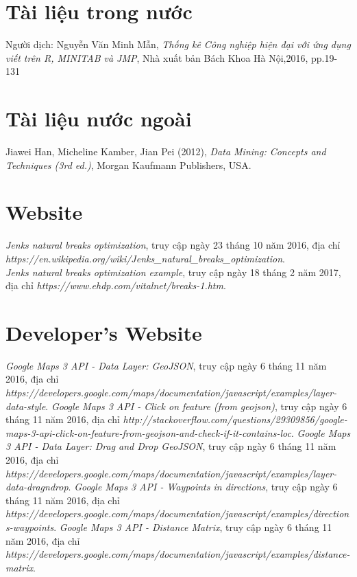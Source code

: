 \documentclass[a4paper, 13pt]{report}
\begin{document}
\cleardoublepage
{}
\begin{thebibliography}{9}
\section*{Tài liệu trong nước}
	Người dịch: Nguyễn Văn Minh Mẫn, 
	\emph{Thống kê Công nghiệp hiện đại với ứng dụng viết trên R, MINITAB và JMP},
	Nhà xuất bản Bách Khoa Hà Nội,2016, pp.19-131
\section*{Tài liệu nước ngoài}
	Jiawei Han, Micheline Kamber, Jian Pei (2012),
	\emph{Data Mining: Concepts and Techniques (3rd ed.)},
	Morgan Kaufmann Publishers, USA.
\section*{Website}
	\emph{Jenks natural breaks optimization}, truy cập ngày 23 tháng 10 năm 2016,
	địa chỉ \emph{https://en.wikipedia.org/wiki/Jenks\_natural\_breaks\_optimization}.\\
	\emph{Jenks natural breaks optimization example}, truy cập ngày 18 tháng 2 năm 2017,
	địa chỉ \emph{https://www.ehdp.com/vitalnet/breaks-1.htm}.
\section*{Developer's Website}
	\emph{Google Maps 3 API - Data Layer: GeoJSON}, truy cập ngày 6 tháng 11 năm 2016,
	địa chỉ \emph{https://developers.google.com/maps/documentation/javascript/examples/layer-data-style}.	
	\emph{Google Maps 3 API - Click on feature (from geojson)}, truy cập ngày 6 tháng 11 năm 2016,
	địa chỉ \emph{http://stackoverflow.com/questions/29309856/google-maps-3-api-click-on-feature-from-geojson-and-check-if-it-contains-loc}.
	\emph{Google Maps 3 API - Data Layer: Drag and Drop GeoJSON}, truy cập ngày 6 tháng 11 năm 2016,
	địa chỉ \emph{https://developers.google.com/maps/documentation/javascript/examples/layer-data-dragndrop}.		
	\emph{Google Maps 3 API - Waypoints in directions}, truy cập ngày 6 tháng 11 năm 2016,
	địa chỉ \emph{https://developers.google.com/maps/documentation/javascript/examples/directions-waypoints}.	
	\emph{Google Maps 3 API - Distance Matrix}, truy cập ngày 6 tháng 11 năm 2016,
	địa chỉ \emph{https://developers.google.com/maps/documentation/javascript/examples/distance-matrix}.	
\end{thebibliography}
\pagebreak
\end{document}
